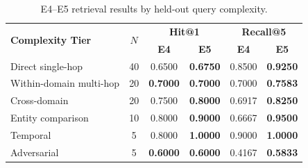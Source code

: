 \begin{table}[!htbp]
\centering
\caption{Scenario 1: Progressive retrieval component stacking on the redesigned Held-Out Test Set ($N=100$).}
\label{tab:retrieval_evaluation}
\end{table}

\begin{table}[!htbp]
\centering
\caption{E4--E5 retrieval results by held-out query complexity.}
\label{tab:retrieval_complexity}
\begingroup
\setlength{\tabcolsep}{7pt}
\renewcommand{\arraystretch}{1.12}
\begin{tabular}{lccccc}
\toprule
\multirow{2}{*}{\textbf{Complexity Tier}} & \multirow{2}{*}{\textbf{$N$}} & \multicolumn{2}{c}{\textbf{Hit@1}} & \multicolumn{2}{c}{\textbf{Recall@5}} \\
\cmidrule(lr){3-4}\cmidrule(lr){5-6}
& & \textbf{E4} & \textbf{E5} & \textbf{E4} & \textbf{E5} \\
\midrule
Direct single-hop       & 40 & 0.6500 & \textbf{0.6750} & 0.8500 & \textbf{0.9250} \\
Within-domain multi-hop & 20 & \textbf{0.7000} & \textbf{0.7000} & 0.7000 & \textbf{0.7583} \\
Cross-domain            & 20 & 0.7500 & \textbf{0.8000} & 0.6917 & \textbf{0.8250} \\
Entity comparison       & 10 & 0.8000 & \textbf{0.9000} & 0.6667 & \textbf{0.9500} \\
Temporal                 & 5 & 0.8000 & \textbf{1.0000} & 0.9000 & \textbf{1.0000} \\
Adversarial              & 5 & \textbf{0.6000} & \textbf{0.6000} & 0.4167 & \textbf{0.5833} \\
\bottomrule
\end{tabular}
\endgroup
\end{table}

